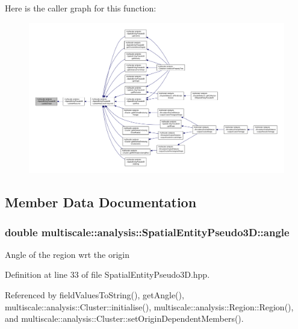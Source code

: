 Here is the caller graph for this function\-:
\nopagebreak
\begin{figure}[H]
\begin{center}
\leavevmode
\includegraphics[width=350pt]{classmultiscale_1_1analysis_1_1SpatialEntityPseudo3D_ad50d0866df26b63dc86853a9ab0c545d_icgraph}
\end{center}
\end{figure}




\subsection{Member Data Documentation}
\hypertarget{classmultiscale_1_1analysis_1_1SpatialEntityPseudo3D_aa077aab864e659f93522863cc10824bb}{
\subsubsection[{angle}]{\setlength{\rightskip}{0pt plus 5cm}double multiscale\-::analysis\-::\-Spatial\-Entity\-Pseudo3\-D\-::angle\hspace{0.3cm}{\ttfamily [protected]}}}\label{classmultiscale_1_1analysis_1_1SpatialEntityPseudo3D_aa077aab864e659f93522863cc10824bb}
Angle of the region wrt the origin 

Definition at line 33 of file Spatial\-Entity\-Pseudo3\-D.\-hpp.



Referenced by field\-Values\-To\-String(), get\-Angle(), multiscale\-::analysis\-::\-Cluster\-::initialise(), multiscale\-::analysis\-::\-Region\-::\-Region(), and multiscale\-::analysis\-::\-Cluster\-::set\-Origin\-Dependent\-Members().

